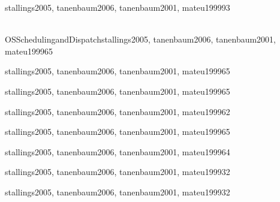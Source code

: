 \begin{syllabus}
    \begin{unit}{\OSConcurrency}{}{stallings2005, tanenbaum2006, tanenbaum2001, mateu1999}{9}{3}
        \OSConcurrencyAllTopics
        \OSConcurrencyAllLearningOutcomes
    \end{unit}
    
    \begin{unit}{\\OSSchedulingandDispatch}{}{stallings2005, tanenbaum2006, tanenbaum2001, mateu1999}{6}{5}
        \OSSchedulingandDispatchAllTopics
        \OSSchedulingandDispatchAllLearningOutcomes
    \end{unit}
    
    \begin{unit}{\OSMemoryManagement}{}{stallings2005, tanenbaum2006, tanenbaum2001, mateu1999}{6}{5}
        \OSMemoryManagementAllTopics
        \OSMemoryManagementAllLearningOutcomes
    \end{unit}
    
    \begin{unit}{\OSDeviceManagement}{}{stallings2005, tanenbaum2006, tanenbaum2001, mateu1999}{6}{5}
        \OSDeviceManagementAllTopics
        \OSDeviceManagementAllLearningOutcomes
    \end{unit}
    
    \begin{unit}{\OSSecurityandProtection}{}{stallings2005, tanenbaum2006, tanenbaum2001, mateu1999}{6}{2}
        \OSSecurityandProtectionAllTopics
        \OSSecurityandProtectionAllLearningOutcomes
    \end{unit}
    
    \begin{unit}{\OSFileSystems}{}{stallings2005, tanenbaum2006, tanenbaum2001, mateu1999}{6}{5}
        \OSFileSystemsAllTopics
        \OSFileSystemsAllLearningOutcomes
    \end{unit}
    
    \begin{unit}{\OSRealTimeandEmbeddedSystems}{}{stallings2005, tanenbaum2006, tanenbaum2001, mateu1999}{6}{4}
        \OSRealTimeandEmbeddedSystemsAllTopics
        \OSRealTimeandEmbeddedSystemsAllLearningOutcomes
    \end{unit}
    
    \begin{unit}{\OSFaultTolerance}{}{stallings2005, tanenbaum2006, tanenbaum2001, mateu1999}{3}{2}
        \OSFaultToleranceAllTopics
        \OSFaultToleranceAllLearningOutcomes
    \end{unit}
    
    \begin{unit}{\OSSystemPerformanceEvaluation}{}{stallings2005, tanenbaum2006, tanenbaum2001, mateu1999}{3}{2}
          \OSSystemPerformanceEvaluationAllTopics
          \OSSystemPerformanceEvaluationAllLearningOutcomes
      \end{unit}
    
    
    \begin{coursebibliography}
    \end{coursebibliography}
    
    \end{syllabus}
    